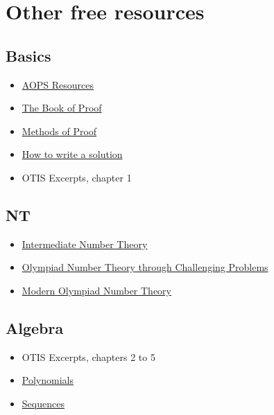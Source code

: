 \chapter{Other free resources}
\section{Basics}
\begin{itemize}
  \item \href{https://artofproblemsolving.com/resources}{AOPS Resources}
  \item \href{https://www.people.vcu.edu/~rhammack/BookOfProof/Main.pdf}{The Book
  of Proof}
  \item
    \href{https://www.its.caltech.edu/~kpilch/olympiad/MethodsOfProof-Complete.pdf}
    {Methods of Proof}
  \item \href{https://artofproblemsolving.com/news/articles/how-to-write-a-solution}
    {How to write a solution}
  \item OTIS Excerpts, chapter 1
\end{itemize}

\section{NT}
\begin{itemize}
  \item
    \href{https://numbertheoryguydotcom.files.wordpress.com/2018/10/main1.pdf}
    {Intermediate Number Theory}
  \item
    \href{http://s3.amazonaws.com/aops-cdn.artofproblemsolving.com/resources/articles/olympiad-number-theory.pdf}
      {Olympiad Number Theory through Challenging Problems}
  \item \href{https://drive.google.com/file/d/1BcJTLjQaelZ4w_70oHKyImC2I8zLfyrt/view?usp=sharing}
    {Modern Olympiad Number Theory}
\end{itemize}

\section{Algebra}
\begin{itemize}
  \item OTIS Excerpts, chapters 2 to 5
  \item
    \href{https://alexanderrem.weebly.com/uploads/7/2/5/6/72566533/polynomials.pdf}
    {Polynomials}
  \item
    \href{https://alexanderrem.weebly.com/uploads/7/2/5/6/72566533/sequences.pdf}
    {Sequences}
\end{itemize}

